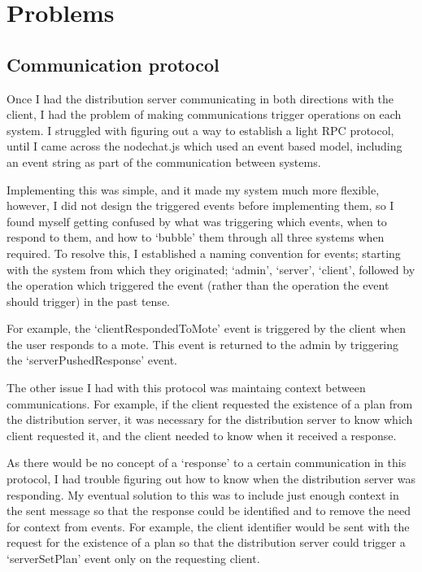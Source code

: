 \documentclass[a4papert,11pt,notitlepage]{ltxdoc}
\begin{document}
\pagebreak
\section{Problems}
\subsection{Communication protocol}
Once I had the distribution server communicating in both directions with the client, I had the problem of making communications trigger operations on each system. I struggled with figuring out a way to establish a light RPC protocol, until I came across the nodechat.js\cite{nodechatjs:web} which used an event based model, including an event string as part of the communication between systems. 

Implementing this was simple, and it made my system much more flexible, however, I did not design the triggered events before implementing them, so I found myself getting confused by what was triggering which events, when to respond to them, and how to `bubble' them through all three systems when required. To resolve this, I established a naming convention for events; starting with the system from which they originated; `admin', `server', `client', followed by the operation which triggered the event (rather than the operation the event should trigger) in the past tense. 

For example, the `clientRespondedToMote' event is triggered by the client when the user responds to a mote. This event is returned to the admin by triggering the `serverPushedResponse' event.

The other issue I had with this protocol was maintaing context between communications. For example, if the client requested the existence of a plan from the distribution server, it was necessary for the distribution server to know which client requested it, and the client needed to know when it received a response. 

As there would be no concept of a `response' to a certain communication in this protocol, I had trouble figuring out how to know when the distribution server was responding. My eventual solution to this was to include just enough context in the sent message so that the response could be identified and to remove the need for context from events. For example, the client identifier would be sent with the request for the existence of a plan so that the distribution server could trigger a `serverSetPlan' event only on the requesting client.
 
\end{document}
